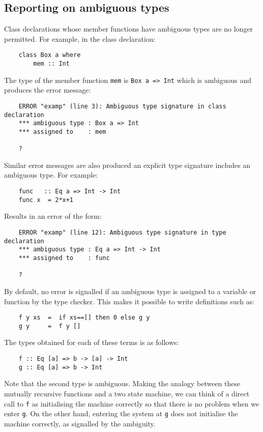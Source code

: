 \subsection{Reporting on ambiguous types}
Class declarations whose member functions have ambiguous types are no
longer permitted.  For example, in the class declaration:
\begin{verbatim}
    class Box a where
        mem :: Int
\end{verbatim}
The type of the member function \verb"mem" 
is \verb"Box a => Int" which is ambiguous
and produces the error message:
\begin{verbatim}
    ERROR "examp" (line 3): Ambiguous type signature in class declaration
    *** ambiguous type : Box a => Int
    *** assigned to    : mem

    ?
\end{verbatim}
Similar error messages are also produced an explicit type signature
includes an ambiguous type.  For example:
\begin{verbatim}
    func   :: Eq a => Int -> Int
    func x  = 2*x+1
\end{verbatim}
Results in an error of the form:
\begin{verbatim}
    ERROR "examp" (line 12): Ambiguous type signature in type declaration
    *** ambiguous type : Eq a => Int -> Int
    *** assigned to    : func

    ?
\end{verbatim}
By default, no error is signalled if an ambiguous type is assigned to a
variable or function by the type checker.  This makes it possible to
write definitions such as:
\begin{verbatim}
    f y xs  =  if xs==[] then 0 else g y
    g y     =  f y []
\end{verbatim}
The types obtained for each of these terms is as follows:
\begin{verbatim}
    f :: Eq [a] => b -> [a] -> Int
    g :: Eq [a] => b -> Int
\end{verbatim}
Note that the second type is ambiguous.  Making the analogy between
these mutually recursive functions and a two state machine, we can
think of a direct call to \verb"f" as initialising the machine correctly so
that there is no problem when we enter \verb"g".  On the other hand, entering
the system at \verb"g" does not initialise the machine correctly, as signalled
by the ambiguity.

